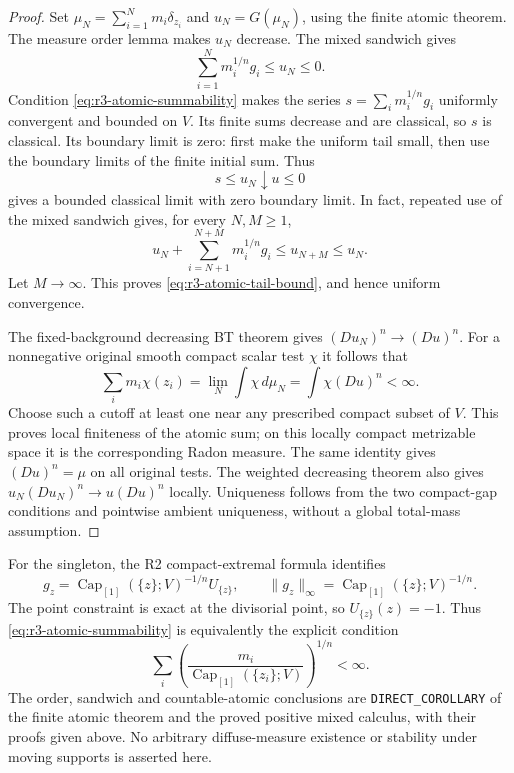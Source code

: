 \documentclass[11pt,a4paper]{article}
\numberwithin{equation}{section}
\theoremstyle{definition}
\theoremstyle{remark}
\begin{document}
\begin{proof}
Set $\mu_N=\sum_{i=1}^N m_i\delta_{z_i}$ and
$u_N=G(\mu_N)$, using the finite atomic theorem. The measure
order lemma makes $u_N$ decrease. The mixed sandwich gives
\[
 \sum_{i=1}^N m_i^{1/n}g_i\leq u_N\leq0.
\]
Condition \eqref{eq:r3-atomic-summability} makes the series
$s=\sum_i m_i^{1/n}g_i$ uniformly convergent and bounded
on $V$. Its finite sums decrease and are classical, so $s$
is classical. Its boundary limit is zero: first make the
uniform tail small, then use the boundary limits of the
finite initial sum. Thus
\[
 s\leq u_N\downarrow u\leq0
\]
gives a bounded classical limit with zero boundary limit.
In fact, repeated use of the mixed sandwich gives, for every
$N,M\geq1$,
\[
 u_N+\sum_{i=N+1}^{N+M}m_i^{1/n}g_i
       \leq u_{N+M}\leq u_N.
\]
Let $M\to\infty$. This proves
\eqref{eq:r3-atomic-tail-bound}, and hence uniform convergence.

The fixed-background decreasing BT theorem gives
$(Du_N)^n\to(Du)^n$. For a nonnegative original smooth
compact scalar test $\chi$ it follows that
\[
 \sum_i m_i\chi(z_i)
    =\lim_N\int\chi\,d\mu_N
    =\int\chi(Du)^n<\infty.
\]
Choose such a cutoff at least one near any prescribed
compact subset of $V$. This proves local finiteness of the
atomic sum; on this locally compact metrizable space it is
the corresponding Radon measure. The same identity gives
$(Du)^n=\mu$ on all original tests. The weighted decreasing
theorem also gives $u_N(Du_N)^n\to u(Du)^n$ locally.
Uniqueness follows from the two compact-gap conditions and
pointwise ambient uniqueness, without a global total-mass
assumption.
\end{proof}

For the singleton, the R2 compact-extremal formula identifies
\[
 g_z=\operatorname{Cap}_{[1]}(\{z\};V)^{-1/n}U_{\{z\}},
 \qquad
 \|g_z\|_\infty
       =\operatorname{Cap}_{[1]}(\{z\};V)^{-1/n}.
\]
The point constraint is exact at the divisorial point, so
$U_{\{z\}}(z)=-1$. Thus \eqref{eq:r3-atomic-summability}
is equivalently the explicit condition
\[
 \sum_i
 \left(\frac{m_i}
 {\operatorname{Cap}_{[1]}(\{z_i\};V)}\right)^{1/n}<\infty.
\]
The order, sandwich and countable-atomic conclusions are
\texttt{DIRECT\_COROLLARY} of the finite atomic theorem and
the proved positive mixed calculus, with their proofs given
above. No arbitrary diffuse-measure existence or stability
under moving supports is asserted here.
\end{document}
